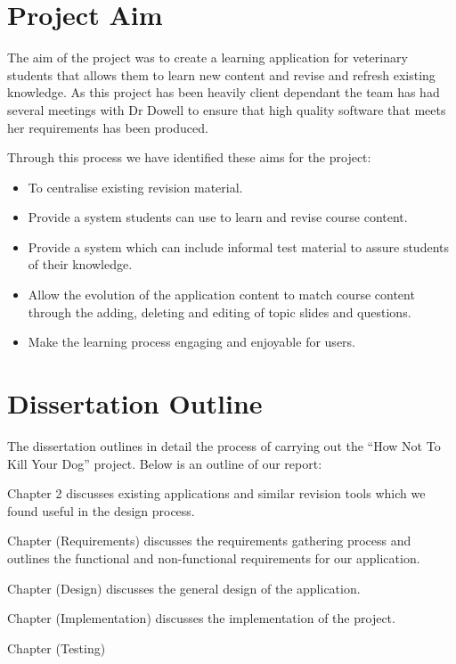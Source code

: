\documentclass{l3proj}
\begin{document}
\section{Project Aim}

The aim of the project was to create a learning application for veterinary students that allows them to learn new content and revise and refresh existing knowledge. As this project has been heavily client dependant the team has had several meetings with Dr Dowell to ensure that high quality software that meets her requirements has been produced.
\newline

Through this process we have identified these aims for the project:
\newline

\begin{itemize}
\item To centralise existing revision material.
\item Provide a system students can use to learn and revise course content.
\item Provide a system which can include informal test material to assure students of their knowledge.
\item Allow the evolution of the application content to match course content through the adding, deleting and editing of topic slides and questions.
\item Make the learning process engaging and enjoyable for users.
\end{itemize}   

\section{Dissertation Outline}

The dissertation outlines in detail the process of carrying out the ``How Not To Kill Your Dog'' project. Below is an outline of our report:

Chapter 2 discusses existing applications and similar revision tools which we found useful in the design process.

Chapter (Requirements) discusses the requirements gathering process and outlines the functional and non-functional requirements for our application.

Chapter (Design) discusses the general design of the application.

Chapter (Implementation) discusses the implementation of the project.

Chapter (Testing)
\end{document}
